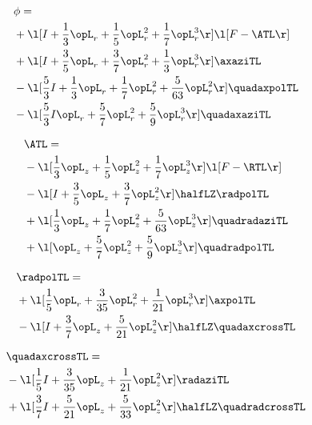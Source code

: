 \begin{alignat}{2} 
\label{eq:scalarFlux_0} 
& \phi = \\ 
& + \l[ I + \frac{1}{3} \opL_r + \frac{1}{5} \opL_r^{2} + \frac{1}{7} \opL_r^{3}  \r] \l[ F - \ATL \r] \nonumber \\ 
& + \l[ I + \frac{3}{5} \opL_r + \frac{3}{7} \opL_r^{2} + \frac{1}{3} \opL_r^{3}  \r] \axaziTL \nonumber \\ 
& - \l[ \frac{5}{3} I + \frac{1}{3} \opL_r + \frac{1}{7} \opL_r^{2} + \frac{5}{63} \opL_r^{2}  \r] \quadaxpolTL \nonumber \\ 
& - \l[ \frac{5}{3} I \opL_r + \frac{5}{7} \opL_r^{2} + \frac{5}{9} \opL_r^{3}  \r] \quadaxaziTL \nonumber \\ 
\end{alignat} 


\begin{alignat}{2} 
\label{eq:isoATL_0} 
& \ATL = \\ 
& - \l[ \frac{1}{3} \opL_z + \frac{1}{5} \opL_z^{2} + \frac{1}{7} \opL_z^{3}  \r] \l[ F - \RTL \r] \nonumber \\ 
& - \l[ I + \frac{3}{5} \opL_z + \frac{3}{7} \opL_z^{2}  \r] \halfLZ \radpolTL \nonumber \\ 
& + \l[ \frac{1}{3} \opL_z + \frac{1}{7} \opL_z^{2} + \frac{5}{63} \opL_z^{3}  \r] \quadradaziTL \nonumber \\ 
& + \l[ \opL_z + \frac{5}{7} \opL_z^{2} + \frac{5}{9} \opL_z^{3}  \r] \quadradpolTL \nonumber \\ 
\end{alignat} 


\begin{alignat}{2} 
\label{eq:linradpolTL_0} 
& \radpolTL = \\ 
& + \l[ \frac{1}{5} \opL_r + \frac{3}{35} \opL_r^{2} + \frac{1}{21} \opL_r^{3}  \r] \axpolTL \nonumber \\ 
& - \l[ I + \frac{3}{7} \opL_z + \frac{5}{21} \opL_z^{2}  \r] \halfLZ \quadaxcrossTL \nonumber \\ 
\end{alignat} 


\begin{alignat}{2} 
\label{eq:quadaxcrossTL_0} 
& \quadaxcrossTL = \\ 
& - \l[ \frac{1}{5} I + \frac{3}{35} \opL_z + \frac{1}{21} \opL_z^{2}  \r] \radaziTL \nonumber \\ 
& + \l[ \frac{3}{7} I + \frac{5}{21} \opL_z + \frac{5}{33} \opL_z^{2}  \r] \halfLZ \quadradcrossTL \nonumber \\ 
\end{alignat} 


